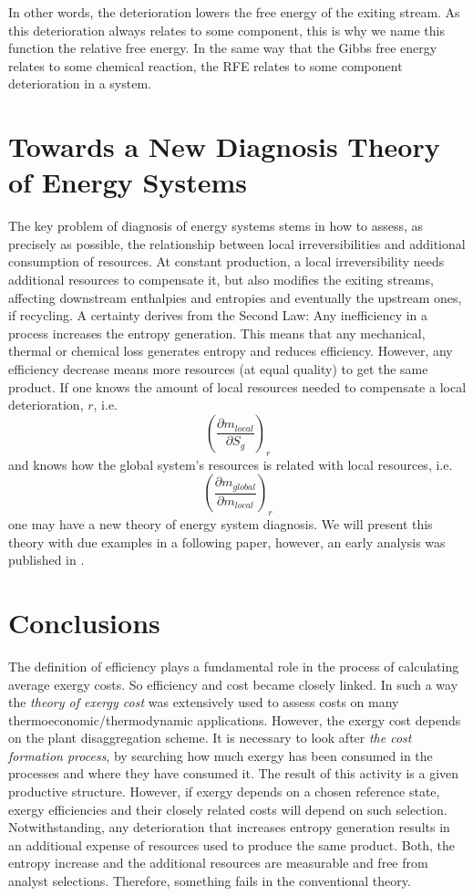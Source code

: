 \documentclass[energies,article,submit,moreauthors,pdftex]{Definitions/mdpi}
\begin{document}
In other words, the deterioration lowers the free energy of the exiting stream. As this deterioration always relates to some component, this is why we name this function the relative free energy. In the same way that the Gibbs free energy relates to some chemical reaction, the RFE relates to some component deterioration in a system.

\section{Towards a New Diagnosis Theory of Energy Systems}
The key problem of diagnosis of energy systems stems in how to assess, as precisely as possible, the relationship between local irreversibilities and additional consumption of resources. At constant production, a local irreversibility needs additional resources to compensate it, but also modifies the exiting streams, affecting downstream enthalpies and entropies and eventually the upstream ones, if recycling. 
A certainty derives from the Second Law: Any inefficiency in a process increases the entropy generation. This means that any mechanical, thermal or chemical loss generates entropy and reduces efficiency. However, any efficiency decrease means more resources (at equal quality) to get the same product. 
If one knows the amount of local resources needed to compensate a local deterioration, $r$, i.e.
\[
\left(\frac{\partial m_{local}}{\partial S_g}\right)_r
\] 
and knows how the global system's resources is related with local resources, i.e.
\[
\left(\frac{\partial m_{global}}{\partial m_{local}}\right)_r
\]
one may have a new theory of energy system diagnosis. We will present this theory with due examples in a following paper, however, an early analysis was published in \cite{Royo1997}.

\section{Conclusions}
The definition of efficiency plays a fundamental role in the process of calculating average exergy costs. So efficiency and cost became closely linked. In such a way the \emph{theory of exergy cost} \cite{Valero1986a,Lozano1993} was extensively used to assess costs on many thermoeconomic/thermodynamic applications. However, the exergy cost depends on the plant disaggregation scheme. It is necessary to look after \emph{the cost formation process}, by searching how much exergy has been consumed in the processes and where they have consumed it. The result of this activity is a given productive structure. However, if exergy depends on a chosen reference state, exergy efficiencies and their closely related costs will depend on such selection. Notwithstanding, any deterioration that increases entropy generation results in an additional expense of resources used to produce the same product. Both, the entropy increase and the additional resources are measurable and free from analyst selections. Therefore, something fails in the conventional theory. 
\end{document}
